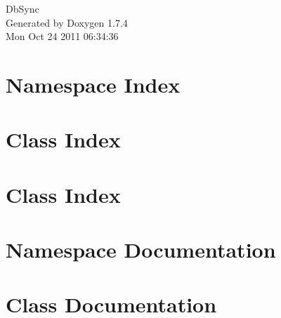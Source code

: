 \documentclass[a4paper]{book}
\begin{document}
\hypersetup{pageanchor=false}
\begin{titlepage}
\vspace*{7cm}
\begin{center}
{\Large DbSync }\\
\vspace*{1cm}
{\large Generated by Doxygen 1.7.4}\\
\vspace*{0.5cm}
{\small Mon Oct 24 2011 06:34:36}\\
\end{center}
\end{titlepage}
\clearemptydoublepage
{}
\tableofcontents
\clearemptydoublepage
{}
\hypersetup{pageanchor=true}
\chapter{Namespace Index}

\chapter{Class Index}

\chapter{Class Index}

\chapter{Namespace Documentation}




\chapter{Class Documentation}














\printindex
\end{document}
